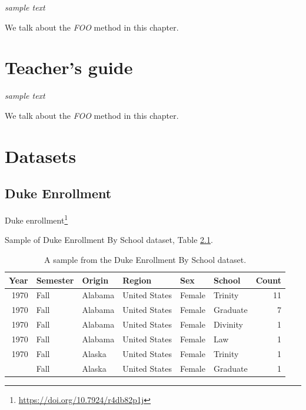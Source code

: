 \documentclass[
]{krantz}
\renewcommand{\href}[2]{#2\footnote{\url{#1}}}
\begin{document}
\emph{sample text}

We talk about the \emph{FOO} method in this chapter.

\hypertarget{teachers-guide}{%
\chapter{Teacher's guide}\label{teachers-guide}}

\emph{sample text}

We talk about the \emph{FOO} method in this chapter.

\cleardoublepage

\hypertarget{appendix-appendix}{%
\appendix {}}


\hypertarget{datasets}{%
\chapter{Datasets}\label{datasets}}

\hypertarget{duke-enrollment}{%
\section*{Duke Enrollment}\label{duke-enrollment}}


\href{https://doi.org/10.7924/r4db82p1j}{Duke enrollment}

Sample of Duke Enrollment By School dataset, Table \ref{tab:duke-school-tab}.

\begin{table}

\caption{\label{tab:duke-school-tab}A sample from the Duke Enrollment By School dataset.}
\centering
\begin{tabular}[t]{rlllllr}
\toprule
Year & Semester & Origin & Region & Sex & School & Count\\
\midrule
1970 & Fall & Alabama & United States & Female & Trinity & 11\\
1970 & Fall & Alabama & United States & Female & Graduate & 7\\
1970 & Fall & Alabama & United States & Female & Divinity & 1\\
1970 & Fall & Alabama & United States & Female & Law & 1\\
1970 & Fall & Alaska & United States & Female & Trinity & 1\\
\addlinespace
1970 & Fall & Alaska & United States & Female & Graduate & 1\\
\bottomrule
\end{tabular}
\end{table}
\end{document}
